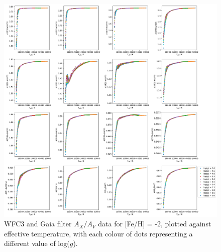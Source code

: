\documentclass[12pt, a4paper]{report}
\begin{document}
\begin{figure}[h]
\begin{center}
\includegraphics[scale=0.3]{../just_full_data/comb/AHub_FeHm2p0_just_Teff_fit_plot_dots.pdf}
\caption{WFC3 and Gaia filter $A_{X}/A_{V}$ data for [Fe/H] = -2, plotted against effective temperature, with each colour of dots representing a different value of log($g$).}
\label{comb Ax/Av data FeH=-2}
\end{center}
\end{figure}
\end{document}
